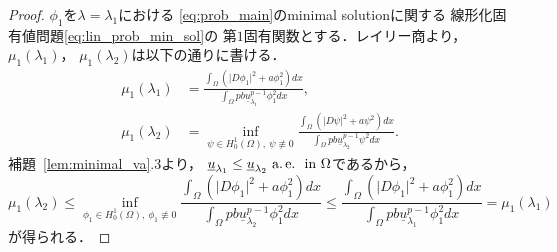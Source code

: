 \begin{proof}
 $\phi_1$を$\lambda = \lambda_1$における
 \ref{eq:prob_main}のminimal solutionに関する
 線形化固有値問題\eqref{eq:lin_prob_min_sol}の
 第$1$固有関数とする．レイリー商より，$\mu_1(\lambda_1)$，
 $\mu_1(\lambda_2)$は以下の通りに書ける．
 \begin{align*}
  \mu_1(\lambda_1) &= \frac{\displaystyle 
  \int_\Omega \left( \lvert D\phi_1 \rvert^2
  + a \phi_1^2 \right) dx}{\displaystyle \int_\Omega p b
  \underline{u}_{\lambda_1}^{p-1} \phi_1^2 dx}, \\
  \mu_1(\lambda_2) &= \inf_{\psi \in H_0^1(\Omega), \ \psi \not\equiv
  0} \frac{\displaystyle 
  \int_\Omega \left( \lvert D\psi \rvert^2
  + a \psi^2 \right) dx}{\displaystyle \int_\Omega p b
  \underline{u}_{\lambda_2}^{p-1} \psi^2 dx}.
 \end{align*}
 補題~\ref{lem:minimal_va}.3より，
 $\underline{u}_{\lambda_1} \leq \underline{u}_{\lambda_2} ~\text{a.\,e.}~ ~\text{in}~
 \Omega$であるから，
 \[
  \mu_1(\lambda_2) \leq 
  \inf_{\phi_1 \in H_0^1(\Omega), \ \phi_1 \not\equiv
  0} \frac{\displaystyle 
  \int_\Omega \left( \lvert D\phi_1 \rvert^2
  + a \phi_1^2 \right) dx}{\displaystyle \int_\Omega p b
  \underline{u}_{\lambda_2}^{p-1} \phi_1^2 dx} \leq
  \frac{\displaystyle 
  \int_\Omega \left( \lvert D\phi_1 \rvert^2
  + a \phi_1^2 \right) dx}{\displaystyle \int_\Omega p b
  \underline{u}_{\lambda_1}^{p-1} \phi_1^2 dx} = \mu_1(\lambda_1)
 \]
 が得られる． \qedhere
\end{proof}

